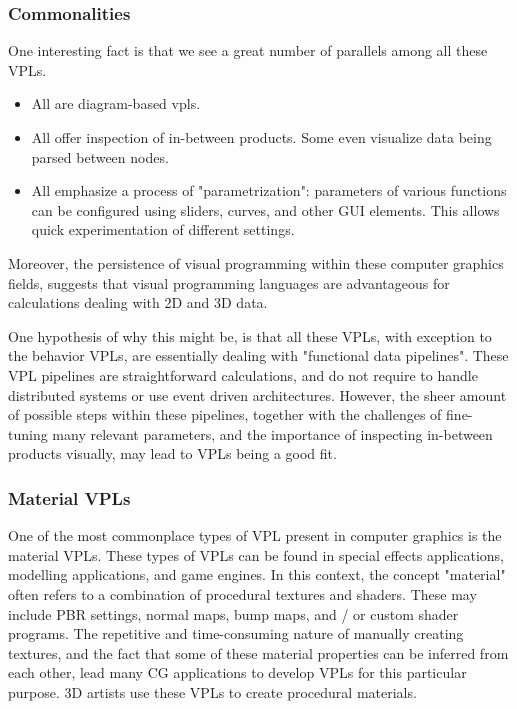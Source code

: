 \subsubsection*{Commonalities}
One interesting fact is that we see a great number of parallels among all these \ac{VPL}s.
\begin{itemize}[-]
  \item All are diagram-based vpls.
  \item All offer inspection of in-between products. Some even visualize data being parsed between nodes.
  \item All emphasize a process of "parametrization": parameters of various functions can be configured using sliders, curves, and other \ac{GUI} elements. This allows quick experimentation of different settings.
\end{itemize}
Moreover, the persistence of visual programming within these computer graphics fields, suggests that visual programming languages are advantageous for calculations dealing with 2D and 3D data.
 
One hypothesis of why this might be, is that all these VPLs, with exception to the behavior VPLs, are essentially dealing with "functional data pipelines".
These VPL pipelines are straightforward calculations, and do not require to handle distributed systems or use event driven architectures.  
However, the sheer amount of possible steps within these pipelines, together with the challenges of fine-tuning many relevant parameters, and the importance of inspecting in-between products visually, may lead to \ac{VPL}s being a good fit.

\subsubsection*{Material VPLs}
One of the most commonplace types of VPL present in computer graphics is the material VPLs. 
These types of VPLs can be found in special effects applications, modelling applications, and game engines. 
In this context, the concept "material" often refers to a combination of procedural textures and shaders. 
These may include PBR settings, normal maps, bump maps, and / or custom shader programs. 
The repetitive and time-consuming nature of manually creating textures, and the fact that some of these material properties can be inferred from each other, lead many CG applications to develop \ac{VPL}s for this particular purpose.
3D artists use these \ac{VPL}s to create procedural materials.

